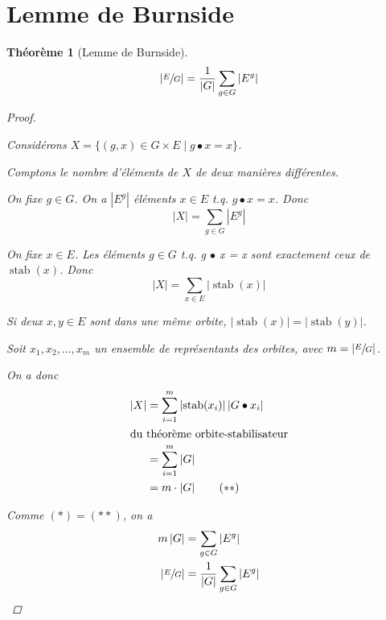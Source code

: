 \documentclass{report}
\newcommand*{\card}[1]{\left| #1 \right|}
\newcommand*{\stab}{\operatorname{stab}}
\newtheorem*{thm}{Th\'eor\`eme}
\theoremstyle{definition}
\theoremstyle{remark}
\begin{document}
	\section{Lemme de Burnside}
	\begin{thm}[Lemme de Burnside]
		\begin{equation*}
			\card{\sfrac{E}{G}} = \dfrac{1}{\card{G}} \displaystyle\sum_{g \in G} \card{E^g}
		\end{equation*}
		\begin{proof}~

			Consid\'erons $X = \{(g,x) \in G \times E \mid g \bullet x = x\}$.

			Comptons le nombre d'\'el\'ements de $X$ de deux mani\`eres diff\'erentes.
			\begin{nlist}
				\item On fixe $g \in G$. On a $\card{E^g}$ \'el\'ements $x \in E$ t.q. $g \bullet x = x$. Donc
				\begin{equation*}
					\card{X} = \sum_{g \in G} \card{E^g}
				\end{equation*}
				\item On fixe $x \in E$. Les \'el\'ements $g \in G$ t.q. g $\bullet$ x = x sont exactement ceux de $\stab(x)$. Donc
				\begin{equation*}
					\card{X} = \sum_{x \in E} \card{\stab(x)}\tag{$*$}
				\end{equation*}

				Si deux $x,y \in E$ sont dans une m\^eme orbite, $\card{\stab(x)} = \card{\stab(y)}$.

				Soit $x_1, x_2, \dots, x_m$ un ensemble de repr\'esentants des orbites, avec $m = \card{\sfrac{E}{G}}$.

				On a donc
				\begin{align*}
					\card{X}&= \sum_{i=1}^{m} \card{\stab(x_i)} \card{G \bullet x_i}\\
					\shortintertext{du th\'eor\`eme orbite-stabilisateur}
					&= \sum_{i=1}^{m} \card{G}\\
					&= m \cdot \card{G}\tag{$**$}
				\end{align*}
			\end{nlist}

			Comme $(*)=(**)$, on a
			\begin{align*}
				m \card{G}&= \sum_{g \in G} \card{E^g}\\
				\card{\sfrac{E}{G}}&= \dfrac{1}{\card{G}} \sum_{g \in G} \card{E^g}
			\end{align*}
		\end{proof}
	\end{thm}
\end{document}
